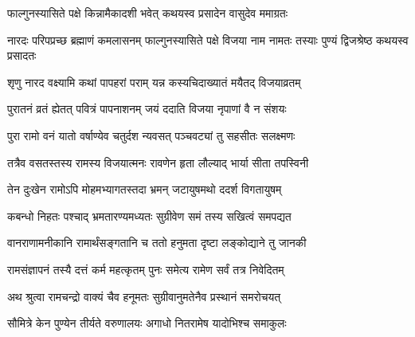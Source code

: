 

\storymeta






\twolineshloka
{फाल्गुनस्यासिते पक्षे किन्नामैकादशी भवेत्}
{कथयस्व प्रसादेन वासुदेव ममाग्रतः}%


\threelineshloka
{नारदः परिपप्रच्छ ब्रह्माणं कमलासनम्}
{फाल्गुनस्यासिते पक्षे विजया नाम नामतः}
{तस्याः पुण्यं द्विजश्रेष्ठ कथयस्व प्रसादतः}%


\twolineshloka
{शृणु नारद वक्ष्यामि कथां पापहरां पराम्}
{यन्न कस्यचिदाख्यातं मयैतद् विजयाव्रतम्}%

\twolineshloka
{पुरातनं व्रतं ह्येतत् पवित्रं पापनाशनम्}
{जयं ददाति विजया नृपाणां वै न संशयः}%

\twolineshloka
{पुरा रामो वनं यातो वर्षाण्येव चतुर्दश}
{न्यवसत् पञ्चवट्यां तु  सहसीतः सलक्ष्मणः}%

\twolineshloka
{तत्रैव वसतस्तस्य रामस्य विजयात्मनः}
{रावणेन हृता लौल्याद् भार्या सीता तपस्विनी}%

\twolineshloka
{तेन दुःखेन रामोऽपि मोहमभ्यागतस्तदा}
{भ्रमन् जटायुषमथो ददर्श विगतायुषम्}%

\twolineshloka
{कबन्धो निहतः पश्चाद् भ्रमतारण्यमध्यतः}
{सुग्रीवेण समं तस्य सखित्वं समपद्यत}%

\twolineshloka
{वानराणामनीकानि रामार्थंसङ्गतानि च}
{ततो हनुमता दृष्टा लङ्कोद्याने तु जानकी}%

\twolineshloka
{रामसंज्ञापनं तस्यै दत्तं कर्म महत्कृतम्}
{पुनः समेत्य रामेण सर्वं तत्र निवेदितम्}%

\twolineshloka
{अथ श्रुत्वा रामचन्द्रो वाक्यं चैव हनूमतः}
{सुग्रीवानुमतेनैव प्रस्थानं समरोचयत्}%


\twolineshloka
{सौमित्रे केन पुण्येन तीर्यते वरुणालयः}
{अगाधो नितरामेष यादोभिश्च समाकुलः}%

